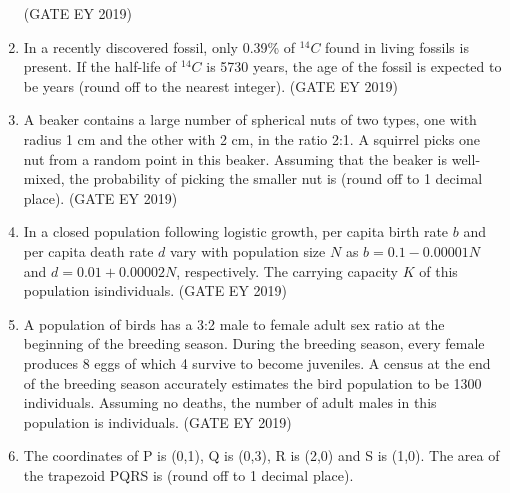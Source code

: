 \documentclass[journal,12pt,onecolumn]{IEEEtran}
\theoremstyle{remark}
\begin{document}
\begin{enumerate}[resume]
\hfill{(GATE EY 2019)}
\item In a recently discovered fossil, only 0.39\% of $^{14}C$ found in living fossils is present. If the half-life of $^{14}C$ is 5730 years, the age of the fossil is expected to be\underline{\hspace{1.5cm}} years (round off to the nearest integer).
\hfill{(GATE EY 2019)}

\item A beaker contains a large number of spherical nuts of two types, one with radius 1 cm and the other with 2 cm, in the ratio 2:1. A squirrel picks one nut from a random point in this beaker. Assuming that the beaker is well-mixed, the probability of picking the smaller nut is \underline{\hspace{1.5cm}} (round off to 1 decimal place).
\hfill{(GATE EY 2019)}
\item In a closed population following logistic growth, per capita birth rate $b$ and per capita death rate $d$ vary with population size $N$ as $b=0.1-0.00001N$ and $d=0.01+0.00002N$, respectively. The carrying capacity $K$ of this population is\underline{\hspace{1.5cm}}individuals.
\hfill{(GATE EY 2019)}
\item A population of birds has a 3:2 male to female adult sex ratio at the beginning of the breeding season. During the breeding season, every female produces 8 eggs of which 4 survive to become juveniles. A census at the end of the breeding season accurately estimates the bird population to be 1300 individuals. Assuming no deaths, the number of adult males in this population is \underline{\hspace{1.5cm}} individuals.
\hfill{(GATE EY 2019)}
\item The coordinates of P is (0,1), Q is (0,3), R is (2,0) and S is (1,0). The area of the trapezoid PQRS is\underline{\hspace{1.5cm}} (round off to 1 decimal place).


\end{enumerate}
\end{document}
